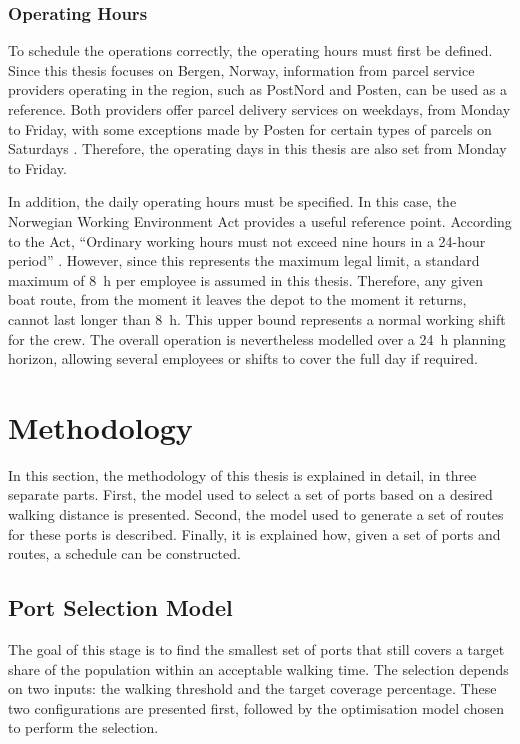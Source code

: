 \documentclass[12pt]{article}
\begin{document}
\subsubsection{Operating Hours}
\label{subsubsec:operating-hours}

To schedule the operations correctly, the operating hours must first be defined. Since this thesis focuses on Bergen, Norway, information from parcel service providers operating in the region, such as PostNord and Posten, can be used as a reference. Both providers offer parcel delivery services on weekdays, from Monday to Friday, with some exceptions made by Posten for certain types of parcels on Saturdays \parencite{posten_hours,portnord_hours}. Therefore, the operating days in this thesis are also set from Monday to Friday.

In addition, the daily operating hours must be specified. In this case, the Norwegian Working Environment Act provides a useful reference point. According to the Act, \enquote{Ordinary working hours must not exceed nine hours in a 24-hour period} \cite{arbeidsmiljoloven_10_4}. However, since this represents the maximum legal limit, a standard maximum of \qty{8}{\hour} per employee is assumed in this thesis. Therefore, any given boat route, from the moment it leaves the depot to the moment it returns, cannot last longer than \qty{8}{\hour}. This upper bound represents a normal working shift for the crew. The overall operation is nevertheless modelled over a \qty{24}{\hour} planning horizon, allowing several employees or shifts to cover the full day if required.

\section{Methodology}
\label{sec:methodology}

In this section, the methodology of this thesis is explained in detail, in three separate parts. First, the model used to select a set of ports based on a desired walking distance is presented. Second, the model used to generate a set of routes for these ports is described. Finally, it is explained how, given a set of ports and routes, a schedule can be constructed.

\subsection{Port Selection Model}
\label{subsec:port-selection-model}

The goal of this stage is to find the smallest set of ports that still covers a target share of the population within an acceptable walking time. The selection depends on two inputs: the walking threshold and the target coverage percentage. These two configurations are presented first, followed by the optimisation model chosen to perform the selection.
\end{document}
